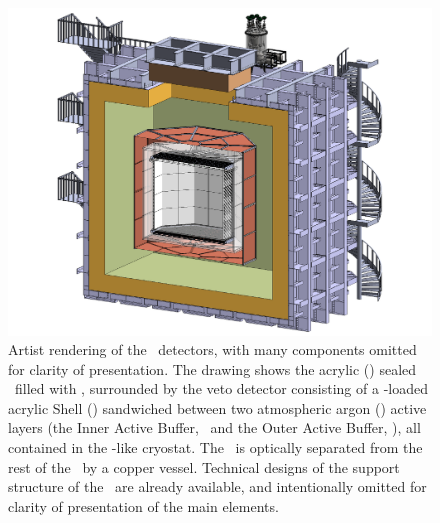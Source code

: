 \begin{figure}[t!]
\includegraphics[width=\columnwidth]{Figures/DSk3D.PDF}
\caption[Artist rendering of the \DSks\ detectors]{Artist rendering of the \DSks\ detectors, with many components omitted for clarity of presentation.  The drawing shows the acrylic (\PMMA) sealed \TPC\  filled with \UAr, surrounded by the veto detector consisting of a -loaded acrylic Shell (\GdAS) sandwiched between two atmospheric argon (\AAr) active layers (the Inner Active Buffer, \IAB\ and the Outer Active Buffer, \OAB), all contained in the \pDUNE-like cryostat.  The \OAB\ is optically separated from the rest of the  \AAr\ by a copper vessel.  Technical designs of the support structure of the \TPC\ are already available, and intentionally omitted for clarity of presentation of the main elements.}
\label{fig:DSk3D}
\end{figure}





